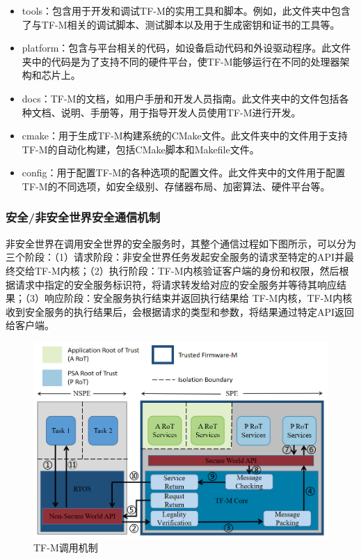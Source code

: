\documentclass[12pt,a4paper]{ctexart}
\numberwithin{figure}{section}
\begin{document}
\begin{itemize}
    \item tools：包含用于开发和调试TF-M的实用工具和脚本。例如，此文件夹中包含了与TF-M相关的调试脚本、测试脚本以及用于生成密钥和证书的工具等。
    \item platform：包含与平台相关的代码，如设备启动代码和外设驱动程序。此文件夹中的代码是为了支持不同的硬件平台，使TF-M能够运行在不同的处理器架构和芯片上。
    \item docs：TF-M的文档，如用户手册和开发人员指南。此文件夹中的文件包括各种文档、说明、手册等，用于指导开发人员使用TF-M进行开发。
    \item cmake：用于生成TF-M构建系统的CMake文件。此文件夹中的文件用于支持TF-M的自动化构建，包括CMake脚本和Makefile文件。
    \item config：用于配置TF-M的各种选项的配置文件。此文件夹中的文件用于配置TF-M的不同选项，如安全级别、存储器布局、加密算法、硬件平台等。
\end{itemize}

\subsubsection{安全/非安全世界安全通信机制}
非安全世界在调用安全世界的安全服务时，其整个通信过程如下图所示，可以分为三个阶段：（1）请求阶段：非安全世界任务发起安全服务的请求至特定的API并最终交给TF-M内核；（2）执行阶段：TF-M内核验证客户端的身份和权限，然后根据请求中指定的安全服务标识符，将请求转发给对应的安全服务并等待其响应结果；（3）响应阶段：安全服务执行结束并返回执行结果给 TF-M内核，TF-M内核收到安全服务的执行结果后，会根据请求的类型和参数，将结果通过特定API返回给客户端。
\begin{figure}
    \centering
    \includegraphics[scale=0.27]{graph/TF-M Secure communication processes.png}
    \caption{TF-M调用机制}
\end{figure}
\end{document}
